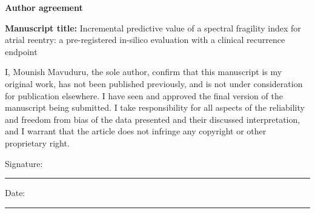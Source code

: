 \documentclass[11pt]{article}
\begin{document}
{\large\bfseries Author agreement}

\textbf{Manuscript title:} Incremental predictive value of a spectral fragility index for atrial reentry: a pre-registered in-silico evaluation with a clinical recurrence endpoint

I, Mounish Mavuduru, the sole author, confirm that this manuscript is my original work, has not been published previously, and is not under consideration for publication elsewhere. I have seen and approved the final version of the manuscript being submitted. I take responsibility for all aspects of the reliability and freedom from bias of the data presented and their discussed interpretation, and I warrant that the article does not infringe any copyright or other proprietary right.

\vspace{3em}Signature: \rule{6cm}{0.4pt}

Date: \rule{4cm}{0.4pt}
\end{document}

